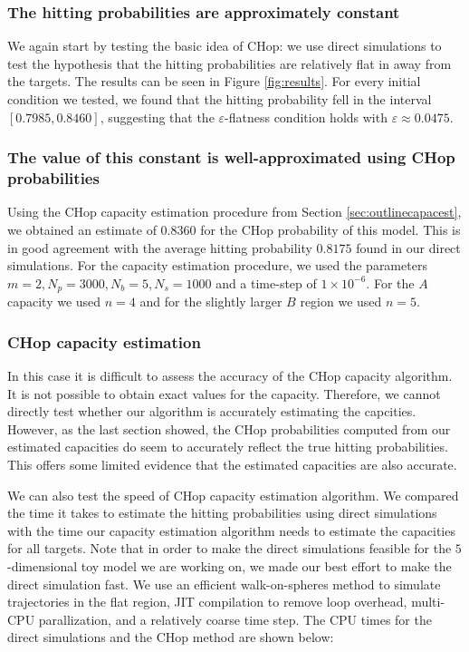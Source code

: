 \documentclass[english, aip, jcp, priprint, graphicx,floatfix]{revtex4-1}
\theoremstyle{plain}
\theoremstyle{definition}
\theoremstyle{plain}
\begin{document}
\subsubsection{The hitting probabilities are approximately constant}

We again start by testing the basic idea of CHop: we use direct simulations to test the hypothesis that the hitting probabilities are relatively flat in away from the targets.  The results can be seen in Figure \ref{fig:results}.   For every initial condition we tested, we found that the hitting probability fell in the interval $[0.7985, 0.8460]$, suggesting that the $\varepsilon$-flatness condition holds with $\varepsilon \approx 0.0475$.



\subsubsection{The value of this constant is well-approximated using CHop probabilities}

Using the CHop capacity estimation procedure from Section \ref{sec:outlinecapacest}, we obtained an estimate of $0.8360$ for the CHop probability of this model.  This is in good agreement with the average hitting probability $0.8175$ found in our direct simulations.  For the capacity estimation procedure, we used the parameters $ m = 2, N_p = 3000, N_b = 5, N_s = 1000$ and a time-step of $1 \times 10^{-6}$.  For the $A$ capacity we used $n = 4$ and for the slightly larger $B$ region we used $n = 5$.  

\subsubsection{CHop capacity estimation}

In this case it is difficult to assess the accuracy of the CHop capacity algorithm.  It is not possible to obtain exact values for the capacity.  Therefore, we cannot directly test whether our algorithm is accurately estimating the capcities.  However, as the last section showed, the CHop probabilities computed from our estimated capacities do seem to accurately reflect the true hitting probabilities.  This offers some limited evidence that the estimated capacities are also accurate.

We can also test the speed of CHop capacity estimation algorithm.  We compared the time it takes to estimate the hitting probabilities using direct simulations with the time our capacity estimation algorithm needs to estimate the capacities for all targets. Note that in order to make the direct simulations feasible for the $5$-dimensional toy model we are working on, we made our best effort to make the direct simulation fast.  We use an efficient walk-on-spheres method to simulate trajectories in the flat region,\cite{bingham1972random} JIT compilation to remove loop overhead, multi-CPU parallization, and a relatively coarse time step.  The CPU times for the direct simulations and the CHop method are shown below:
\end{document}

